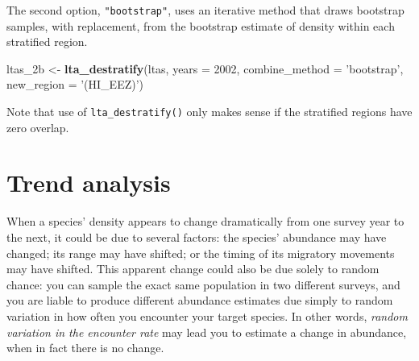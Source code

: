 \documentclass[
]{book}
\newenvironment{Shaded}{\begin{snugshade}}{\end{snugshade}}
\newcommand{\DataTypeTok}[1]{\textcolor[rgb]{0.13,0.29,0.53}{#1}}
\newcommand{\DecValTok}[1]{\textcolor[rgb]{0.00,0.00,0.81}{#1}}
\newcommand{\FloatTok}[1]{\textcolor[rgb]{0.00,0.00,0.81}{#1}}
\newcommand{\KeywordTok}[1]{\textcolor[rgb]{0.13,0.29,0.53}{\textbf{#1}}}
\newcommand{\NormalTok}[1]{#1}
\newcommand{\OperatorTok}[1]{\textcolor[rgb]{0.81,0.36,0.00}{\textbf{#1}}}
\newcommand{\OtherTok}[1]{\textcolor[rgb]{0.56,0.35,0.01}{#1}}
\newcommand{\StringTok}[1]{\textcolor[rgb]{0.31,0.60,0.02}{#1}}
\begin{document}
The second option, \texttt{"bootstrap"}, uses an iterative method that draws bootstrap samples, with replacement, from the bootstrap estimate of density within each stratified region.

\begin{Shaded}
\begin{Highlighting}[]
\NormalTok{ltas_2b <-}
\StringTok{  }\KeywordTok{lta_destratify}\NormalTok{(ltas,}
               \DataTypeTok{years =} \DecValTok{2002}\NormalTok{,}
               \DataTypeTok{combine_method =} \StringTok{'bootstrap'}\NormalTok{,}
               \DataTypeTok{new_region =} \StringTok{'(HI_EEZ)'}\NormalTok{)}
\end{Highlighting}
\end{Shaded}

\begin{Shaded}
\end{Shaded}

Note that use of \texttt{lta\_destratify()} only makes sense if the stratified regions have zero overlap.

\hypertarget{trend-analysis}{%
\chapter{Trend analysis}\label{trend-analysis}}

When a species' density appears to change dramatically from one survey year to the next, it could be due to several factors: the species' abundance may have changed; its range may have shifted; or the timing of its migratory movements may have shifted. This apparent change could also be due solely to random chance: you can sample the exact same population in two different surveys, and you are liable to produce different abundance estimates due simply to random variation in how often you encounter your target species. In other words, \emph{random variation in the encounter rate} may lead you to estimate a change in abundance, when in fact there is no change.
\end{document}
